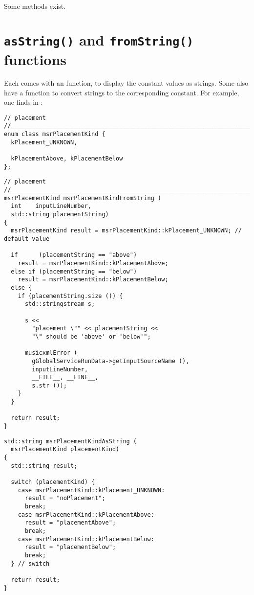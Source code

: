 Some  methods exist. %


\section{{\tt *asString()} and {\tt *fromString()} functions}

Each \enumType comes with an  function, to display the constant values as strings. Some also have a  function to convert strings to the corresponding constant. For example, one finds in :
\begin{lstlisting}[language=CPlusPlus]
// placement
//______________________________________________________________________________
enum class msrPlacementKind {
  kPlacement_UNKNOWN,

  kPlacementAbove, kPlacementBelow
};
\end{lstlisting}

\begin{lstlisting}[language=CPlusPlus]
// placement
//______________________________________________________________________________
msrPlacementKind msrPlacementKindFromString (
  int    inputLineNumber,
  std::string placementString)
{
  msrPlacementKind result = msrPlacementKind::kPlacement_UNKNOWN; // default value

  if      (placementString == "above")
    result = msrPlacementKind::kPlacementAbove;
  else if (placementString == "below")
    result = msrPlacementKind::kPlacementBelow;
  else {
    if (placementString.size ()) {
      std::stringstream s;

      s <<
        "placement \"" << placementString <<
        "\" should be 'above' or 'below'";

      musicxmlError (
        gGlobalServiceRunData->getInputSourceName (),
        inputLineNumber,
        __FILE__, __LINE__,
        s.str ());
    }
  }

  return result;
}
\end{lstlisting}

\begin{lstlisting}[language=CPlusPlus]
std::string msrPlacementKindAsString (
  msrPlacementKind placementKind)
{
  std::string result;

  switch (placementKind) {
    case msrPlacementKind::kPlacement_UNKNOWN:
      result = "noPlacement";
      break;
    case msrPlacementKind::kPlacementAbove:
      result = "placementAbove";
      break;
    case msrPlacementKind::kPlacementBelow:
      result = "placementBelow";
      break;
  } // switch

  return result;
}
\end{lstlisting}

